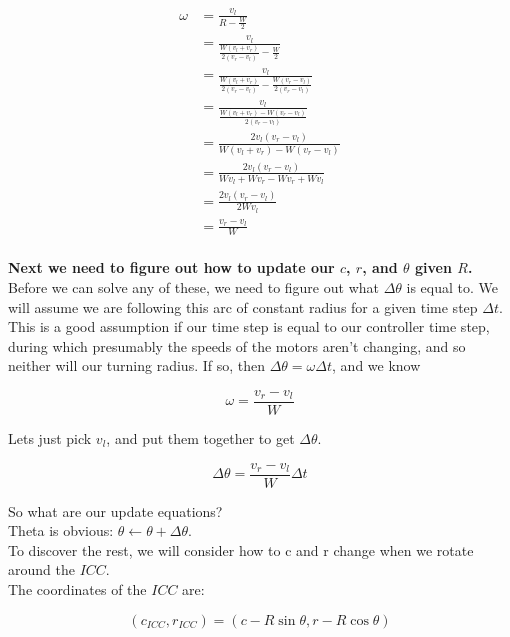 \documentclass{article}
\begin{document}
\begin{align*}
  \omega &= \frac{v_l}{R-\frac{W}{2}}\\[1em]
         &= \frac{v_l}{\frac{W(v_l+v_r)}{2(v_r - v_l)}-\frac{W}{2}}\\[1em]
         &= \frac{v_l}{\frac{W(v_l+v_r)}{2(v_r - v_l)}-\frac{W(v_r - v_l)}{2(v_r - v_l)}}\\[1em]
         &= \frac{v_l}{\frac{W(v_l+v_r)-W(v_r - v_l)}{2(v_r - v_l)}}\\[1em]
         &= \frac{2v_l(v_r - v_l)}{W(v_l+v_r)-W(v_r - v_l)}\\[1em]
         &= \frac{2v_l(v_r - v_l)}{Wv_l+Wv_r-Wv_r+Wv_l}\\[1em]
         &= \frac{2v_l(v_r - v_l)}{2Wv_l}\\[1em]
         &= \frac{v_r - v_l}{W}\\[1em]
\end{align*}


\textbf{Next we need to figure out how to update our $c$, $r$, and $\theta$ given $R$.} \\

Before we can solve any of these, we need to figure out what $\Delta\theta$ is equal to. We will assume we are following this arc of constant radius for a given time step $\Delta t$. This is a good assumption if our time step is equal to our controller time step, during which presumably the speeds of the motors aren't changing, and so neither will our turning radius. If so, then $\Delta\theta = \omega\Delta t$, and we know

$$\omega=\frac{v_r - v_l}{W}$$

Lets just pick $v_l$, and put them together to get $\Delta\theta$.

$$\Delta\theta = \frac{v_r - v_l}{W}\Delta t$$

So what are our update equations? \\

Theta is obvious: $\theta \leftarrow \theta+\Delta\theta$. \\

To discover the rest, we will consider how to c and r change when we rotate around the $ICC$. \\

The coordinates of the $ICC$ are:

$$(c_{ICC}, r_{ICC}) = (c-R\sin{\theta}, r-R\cos{\theta})$$
\end{document}
